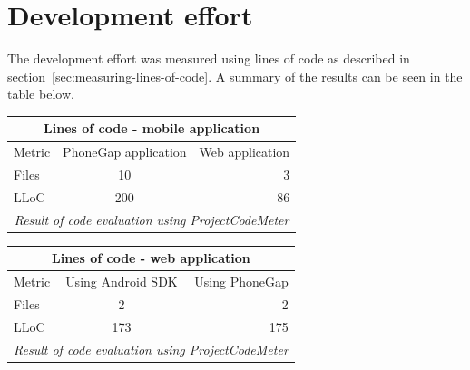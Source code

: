 \section{Development effort}\label{sec:development-effort}
The development effort was measured using lines of code as described in section~\ref{sec:measuring-lines-of-code}. A summary of the results can be seen in the table below.

\begin{tabular}{ | l | c | r | }
    \hline
    \multicolumn{3}{|c|}{Lines of code - mobile application} \\
    \hline
	Metric & PhoneGap application &  Web application \\
	\hline
	Files & 10 & 3\\
	LLoC & 200 & 86\\	
	\hline
	\multicolumn{3}{c}{\emph{Result of code evaluation using ProjectCodeMeter}}
\end{tabular}

\begin{tabular}{ | l | c | r | }
    \hline
    \multicolumn{3}{|c|}{Lines of code - web application} \\
    \hline
	Metric & Using Android SDK & Using PhoneGap \\
	\hline
	Files & 2 & 2 \\
	LLoC & 173 & 175 \\	
	\hline
	\multicolumn{3}{c}{\emph{Result of code evaluation using ProjectCodeMeter}}
\end{tabular}

